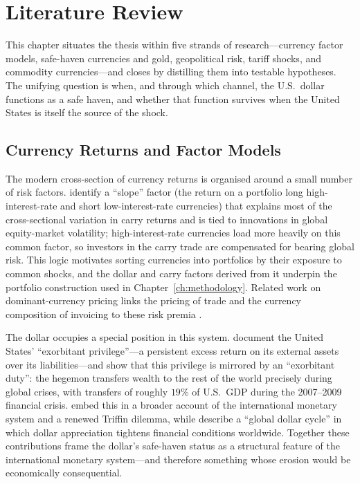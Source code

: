 
\chapter{Literature Review}
\label{ch:literature}

This chapter situates the thesis within five strands of research---currency
factor models, safe-haven currencies and gold, geopolitical risk, tariff shocks,
and commodity currencies---and closes by distilling them into testable
hypotheses. The unifying question is when, and through which channel, the U.S.\
dollar functions as a safe haven, and whether that function survives when the
United States is itself the source of the shock.


\section{Currency Returns and Factor Models}
\label{sec:lit_currency_factors}

The modern cross-section of currency returns is organised around a small number
of risk factors. \textcite{lustig2011} identify a ``slope'' factor (the return on
a portfolio long high-interest-rate and short low-interest-rate currencies) that
explains most of the cross-sectional variation in carry returns and is tied to
innovations in global equity-market volatility; high-interest-rate currencies
load more heavily on this common factor, so investors in the carry trade are
compensated for bearing global risk. This logic motivates sorting currencies into
portfolios by their exposure to common shocks, and the dollar and carry factors
derived from it underpin the portfolio construction used in
Chapter~\ref{ch:methodology}. Related work on dominant-currency pricing links the
pricing of trade and the currency composition of invoicing to these risk premia
\parencite{dalgic2024,dalgic2025}.

The dollar occupies a special position in this system. \textcite{gourinchasrey2005}
document the United States' ``exorbitant privilege''---a persistent excess return
on its external assets over its liabilities---and \textcite{gourinchas2017} show
that this privilege is mirrored by an ``exorbitant duty'': the hegemon transfers
wealth to the rest of the world precisely during global crises, with transfers of
roughly $19\%$ of U.S.\ GDP during the 2007--2009 financial crisis. \textcite{gourinchas2019}
embed this in a broader account of the international monetary system and a renewed
Triffin dilemma, while \textcite{obstfeld2023} describe a ``global dollar cycle''
in which dollar appreciation tightens financial conditions worldwide. Together these
contributions frame the dollar's safe-haven status as a structural feature of the
international monetary system---and therefore something whose erosion would be
economically consequential.


